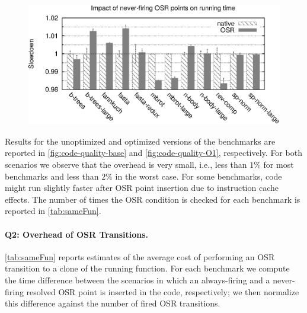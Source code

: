 \begin{description}
\ifdefined\noauthorea
\begin{figure}[t]
\begin{center}
\includegraphics[width=0.95\columnwidth]{figures/code-quality-O1-noBB/code-quality-O1-noBB.eps}
\caption{\protect}
\end{center}
\end{figure}
\fi

Results for the unoptimized and optimized versions of the benchmarks are reported in \myfigure\ref{fig:code-quality-base} and \myfigure\ref{fig:code-quality-O1}, respectively. For both scenarios we observe that the overhead is very small, i.e., less than $1\%$ for most benchmarks and less than $2\%$ in the worst case. For some benchmarks, code might run slightly faster after OSR point insertion due to instruction cache effects.
The number of times the OSR condition is checked for each benchmark is 
reported in \mytable\ref{tab:sameFun}.

\paragraph{Q2: Overhead of OSR Transitions.}

\mytable\ref{tab:sameFun} reports estimates of the average cost of performing an OSR transition to a clone of the running function. For each benchmark we compute the time difference between the scenarios in which an always-firing and a never-firing resolved OSR point is inserted in the code, respectively; we then normalize this difference against the number of fired OSR transitions.


\end{description}
